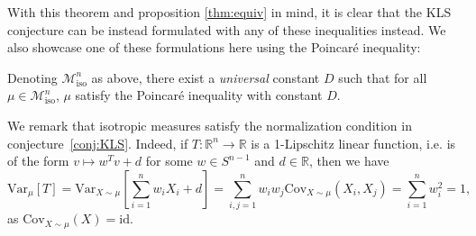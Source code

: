 With this theorem and proposition \ref{thm:equiv} in mind, it is clear that the KLS conjecture can be 
instead formulated with any of these inequalities instead. We also showcase one of these formulations here 
using the Poincaré inequality:

\begin{conjecture}
  Denoting \(\mathscr{M}^n_{\text{iso}}\) as above, there exist a \textit{universal} constant \(D\) 
  such that for all \(\mu \in \mathscr{M}^n_{\text{iso}}\), \(\mu\) satisfy the Poincaré inequality 
  with constant \(D\).
\end{conjecture}

We remark that isotropic measures satisfy the normalization condition in conjecture~\ref{conj:KLS}. Indeed, if 
\(T : \mathbb{R}^n \to \mathbb{R}\) is a 1-Lipschitz linear function, i.e. is of the form \(v \mapsto w^T v + d\) 
for some \(w \in S^{n - 1}\) and \(d \in \mathbb{R}\), then we have
\[\text{Var}_{\mu}[T] = \text{Var}_{X \sim \mu}\left[\sum_{i = 1}^n w_i X_i + d\right] 
    = \sum_{i, j = 1}^n w_i w_j \text{Cov}_{X \sim \mu}(X_i, X_j) = \sum_{i = 1}^n w_i^2 = 1,\]
as \(\text{Cov}_{X \sim \mu}(X) = \text{id}\).

